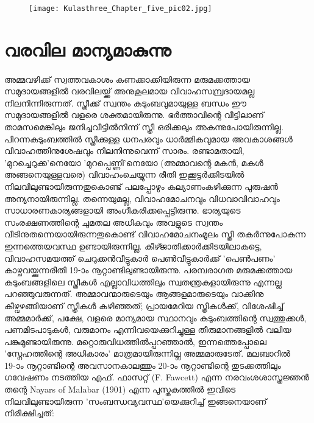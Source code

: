\begin{figure}[h]
\begin{center}
\texttt{[image: Kulasthree\_Chapter\_five\_pic02.jpg]}
\end{center}
\end{figure}

\section{വരവില മാന്യമാകുന്നു}
\label{ch5sec2}
\paragraph{}
അമ്മവഴിക്ക് സ്വത്തവകാശം കണക്കാക്കിയിരുന്ന മരുമക്കത്തായ സമുദായങ്ങളിൽ വരവിലയ്ക്ക് അനുകൂലമായ വിവാഹസമ്പ്രദായമല്ല നിലനിന്നിരുന്നത്. സ്ത്രീക്ക് സ്വന്തം കുടുംബവുമായുള്ള ബന്ധം ഈ സമുദായങ്ങളിൽ വളരെ ശക്തമായിരുന്നു. ഭർത്താവിന്റെ വീട്ടിലാണ് താമസമെങ്കിലും ജനിച്ചവീട്ടിൽനിന്ന് സ്ത്രീ ഒരിക്കലും അകന്നുപോയിരുന്നില്ല. പിറന്നകുടുംബത്തിൽ സ്ത്രീക്കുള്ള ധനപരവും ധാർമ്മികവുമായ അവകാശങ്ങൾ വിവാഹത്തിനുശേഷവും നിലനിന്നുവെന്ന് സാരം. രണ്ടാമതായി, 'മുറച്ചെറുക്ക'നെയോ 'മുറപ്പെണ്ണി'നെയോ (അമ്മാവന്റെ മകൻ, മകൾ അങ്ങനെയുള്ളവരെ) വിവാഹംചെയ്യുന്ന രീതി ഇക്കൂട്ടർക്കിടയിൽ നിലവിലുണ്ടായിരുന്നതുകൊണ്ട് പലപ്പോഴും കല്യാണംകഴിക്കുന്ന പുരുഷൻ അന്യനായിരുന്നില്ല. തന്നെയുമല്ല, വിവാഹമോചനവും വിധവാവിവാഹവും സാധാരണകാര്യങ്ങളായി അംഗീകരിക്കപ്പെട്ടിരുന്നു. ഭാര്യയുടെ സംരക്ഷണത്തിന്റെ ചുമതല അധികവും അവളുടെ സ്വന്തം വീടിനുതന്നെയായിരുന്നതുകൊണ്ട് വിവാഹമോചനംമൂലം സ്ത്രീ തകർന്നുപോകുന്ന ഇന്നത്തെയവസ്ഥ ഉണ്ടായിരുന്നില്ല. കീഴ്ജാതിക്കാർക്കിടയിലാകട്ടെ, വിവാഹസമയത്ത് ചെറുക്കൻവീട്ടുകാർ പെൺവീട്ടുകാർക്ക് 'പെൺപണം' കാഴ്ചവയ്ക്കുന്നരീതി 19-ാം നൂറ്റാണ്ടിലുണ്ടായിരുന്നു. പരമ്പരാഗത മരുമക്കത്തായ കുടുംബങ്ങളിലെ സ്ത്രീകൾ എല്ലാവിധത്തിലും സ്വതന്ത്രകളായിരുന്നു എന്നല്ല പറഞ്ഞുവരുന്നത്. അമ്മാവന്മാരുടെയും ആങ്ങളമാരുടെയും വാക്കിനു കീഴ്വഴങ്ങിയാണ് സ്ത്രീകൾ കഴിഞ്ഞത്; പ്രായമേറിയ സ്ത്രീകൾക്ക്, വിശേഷിച്ച് അമ്മമാർക്ക്, പക്ഷേ, വളരെ മാന്യമായ സ്ഥാനവും കുടുംബത്തിന്റെ സ്വത്തുക്കൾ, പണമിടപാടുകൾ, വരുമാനം എന്നിവയെക്കുറിച്ചുള്ള തീരുമാനങ്ങളിൽ വലിയ പങ്കുമുണ്ടായിരുന്നു. മറ്റൊരുവിധത്തിൽപ്പറഞ്ഞാൽ, ഇന്നത്തെപ്പോലെ 'സ്നേഹത്തിന്റെ അധികാരം' മാത്രമായിരുന്നില്ല അമ്മമാരുടേത്. മലബാറിൽ 19-ാം നൂറ്റാണ്ടിന്റെ അവസാനകാലത്തും 20-ാം നൂറ്റാണ്ടിന്റെ തുടക്കത്തിലും ഗവേഷണം നടത്തിയ എഫ്. ഫാസറ്റ് (F. Fawcett) എന്ന നരവംശശാസ്ത്രജ്ഞൻ തന്റെ Nayars of Malabar (1901) എന്ന പുസ്തകത്തിൽ ഇവിടെ നിലവിലുണ്ടായിരുന്ന 'സംബന്ധവ്യവസ്ഥ'യെക്കുറിച്ച് ഇങ്ങനെയാണ് നിരീക്ഷിച്ചത്:


